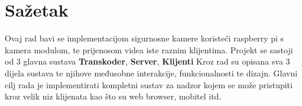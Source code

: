 \section{Sažetak}
Ovaj rad bavi se implementacijom sigurnosne kamere koristeći raspberry pi s kamera modulom, 
te prijenosom videa iste raznim klijentima.
\paraBreak
Projekt se sastoji od 3 glavna sustava \textbf{Transkoder}, \textbf{Server}, \textbf{Klijenti}
\paraBreak
Kroz rad su opisana sva 3 dijela sustava te njihove međusobne interakcije, funkcionalnosti te dizajn.
\paraBreak
Glavni cilj rada je implementirati kompletni sustav za nadzor kojem se može pristupiti kroz velik niz klijenata kao što su web browser, mobitel itd.

